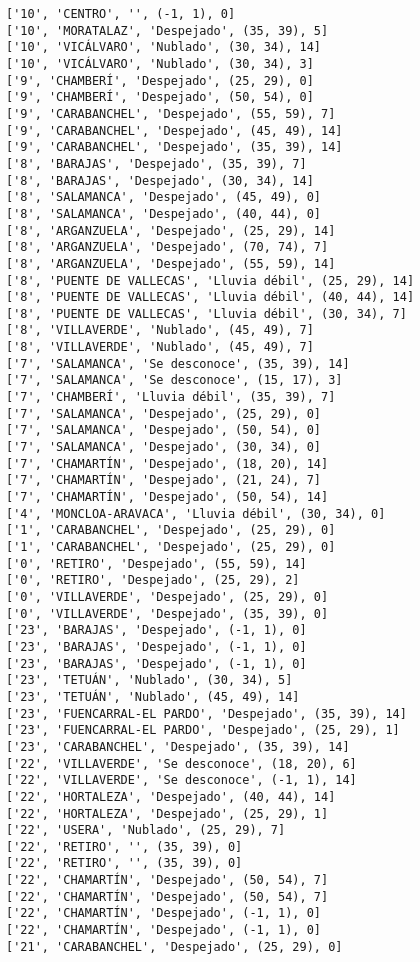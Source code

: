 \documentclass[11pt]{article}
\begin{document}
\begin{Verbatim}[commandchars=\\\{\}]
['10', 'CENTRO', '', (-1, 1), 0]
['10', 'MORATALAZ', 'Despejado', (35, 39), 5]
['10', 'VICÁLVARO', 'Nublado', (30, 34), 14]
['10', 'VICÁLVARO', 'Nublado', (30, 34), 3]
['9', 'CHAMBERÍ', 'Despejado', (25, 29), 0]
['9', 'CHAMBERÍ', 'Despejado', (50, 54), 0]
['9', 'CARABANCHEL', 'Despejado', (55, 59), 7]
['9', 'CARABANCHEL', 'Despejado', (45, 49), 14]
['9', 'CARABANCHEL', 'Despejado', (35, 39), 14]
['8', 'BARAJAS', 'Despejado', (35, 39), 7]
['8', 'BARAJAS', 'Despejado', (30, 34), 14]
['8', 'SALAMANCA', 'Despejado', (45, 49), 0]
['8', 'SALAMANCA', 'Despejado', (40, 44), 0]
['8', 'ARGANZUELA', 'Despejado', (25, 29), 14]
['8', 'ARGANZUELA', 'Despejado', (70, 74), 7]
['8', 'ARGANZUELA', 'Despejado', (55, 59), 14]
['8', 'PUENTE DE VALLECAS', 'Lluvia débil', (25, 29), 14]
['8', 'PUENTE DE VALLECAS', 'Lluvia débil', (40, 44), 14]
['8', 'PUENTE DE VALLECAS', 'Lluvia débil', (30, 34), 7]
['8', 'VILLAVERDE', 'Nublado', (45, 49), 7]
['8', 'VILLAVERDE', 'Nublado', (45, 49), 7]
['7', 'SALAMANCA', 'Se desconoce', (35, 39), 14]
['7', 'SALAMANCA', 'Se desconoce', (15, 17), 3]
['7', 'CHAMBERÍ', 'Lluvia débil', (35, 39), 7]
['7', 'SALAMANCA', 'Despejado', (25, 29), 0]
['7', 'SALAMANCA', 'Despejado', (50, 54), 0]
['7', 'SALAMANCA', 'Despejado', (30, 34), 0]
['7', 'CHAMARTÍN', 'Despejado', (18, 20), 14]
['7', 'CHAMARTÍN', 'Despejado', (21, 24), 7]
['7', 'CHAMARTÍN', 'Despejado', (50, 54), 14]
['4', 'MONCLOA-ARAVACA', 'Lluvia débil', (30, 34), 0]
['1', 'CARABANCHEL', 'Despejado', (25, 29), 0]
['1', 'CARABANCHEL', 'Despejado', (25, 29), 0]
['0', 'RETIRO', 'Despejado', (55, 59), 14]
['0', 'RETIRO', 'Despejado', (25, 29), 2]
['0', 'VILLAVERDE', 'Despejado', (25, 29), 0]
['0', 'VILLAVERDE', 'Despejado', (35, 39), 0]
['23', 'BARAJAS', 'Despejado', (-1, 1), 0]
['23', 'BARAJAS', 'Despejado', (-1, 1), 0]
['23', 'BARAJAS', 'Despejado', (-1, 1), 0]
['23', 'TETUÁN', 'Nublado', (30, 34), 5]
['23', 'TETUÁN', 'Nublado', (45, 49), 14]
['23', 'FUENCARRAL-EL PARDO', 'Despejado', (35, 39), 14]
['23', 'FUENCARRAL-EL PARDO', 'Despejado', (25, 29), 1]
['23', 'CARABANCHEL', 'Despejado', (35, 39), 14]
['22', 'VILLAVERDE', 'Se desconoce', (18, 20), 6]
['22', 'VILLAVERDE', 'Se desconoce', (-1, 1), 14]
['22', 'HORTALEZA', 'Despejado', (40, 44), 14]
['22', 'HORTALEZA', 'Despejado', (25, 29), 1]
['22', 'USERA', 'Nublado', (25, 29), 7]
['22', 'RETIRO', '', (35, 39), 0]
['22', 'RETIRO', '', (35, 39), 0]
['22', 'CHAMARTÍN', 'Despejado', (50, 54), 7]
['22', 'CHAMARTÍN', 'Despejado', (50, 54), 7]
['22', 'CHAMARTÍN', 'Despejado', (-1, 1), 0]
['22', 'CHAMARTÍN', 'Despejado', (-1, 1), 0]
['21', 'CARABANCHEL', 'Despejado', (25, 29), 0]

\end{Verbatim}
\end{document}
